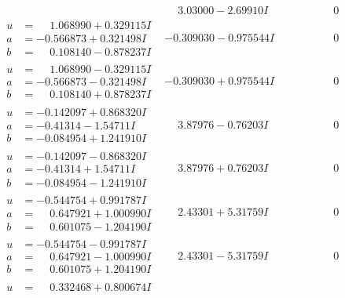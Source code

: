 \documentclass[1p]{elsarticle_modified}
\theoremstyle{definition}
\begin{document}
$$\begin{array}{c|c|c}
 & \phantom{-}3.03000 - 2.69910 I & \phantom{-0.000000 } 0 \\ \hline\begin{aligned}
u &= \phantom{-}1.068990 + 0.329115 I \\
a &= -0.566873 + 0.321498 I \\
b &= \phantom{-}0.108140 - 0.878237 I\end{aligned}
 & -0.309030 - 0.975544 I & \phantom{-0.000000 } 0 \\ \hline\begin{aligned}
u &= \phantom{-}1.068990 - 0.329115 I \\
a &= -0.566873 - 0.321498 I \\
b &= \phantom{-}0.108140 + 0.878237 I\end{aligned}
 & -0.309030 + 0.975544 I & \phantom{-0.000000 } 0 \\ \hline\begin{aligned}
u &= -0.142097 + 0.868320 I \\
a &= -0.41314 - 1.54711 I \\
b &= -0.084954 + 1.241910 I\end{aligned}
 & \phantom{-}3.87976 - 0.76203 I & \phantom{-0.000000 } 0 \\ \hline\begin{aligned}
u &= -0.142097 - 0.868320 I \\
a &= -0.41314 + 1.54711 I \\
b &= -0.084954 - 1.241910 I\end{aligned}
 & \phantom{-}3.87976 + 0.76203 I & \phantom{-0.000000 } 0 \\ \hline\begin{aligned}
u &= -0.544754 + 0.991787 I \\
a &= \phantom{-}0.647921 + 1.000990 I \\
b &= \phantom{-}0.601075 - 1.204190 I\end{aligned}
 & \phantom{-}2.43301 + 5.31759 I & \phantom{-0.000000 } 0 \\ \hline\begin{aligned}
u &= -0.544754 - 0.991787 I \\
a &= \phantom{-}0.647921 - 1.000990 I \\
b &= \phantom{-}0.601075 + 1.204190 I\end{aligned}
 & \phantom{-}2.43301 - 5.31759 I & \phantom{-0.000000 } 0 \\ \hline\begin{aligned}
u &= \phantom{-}0.332468 + 0.800674 I \\

\end{aligned}
\end{array}$$
\end{document}
